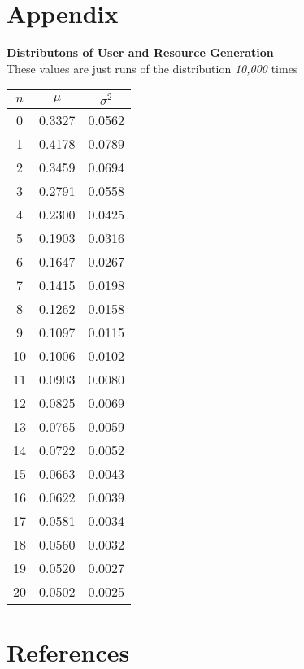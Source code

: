 \documentclass[12pt,a4paper]{report}
\begin{document}
\chapter{Appendix}

\begin{center}
\large
\textup{\textbf{Distributons of User and Resource Generation\\}}
\normalsize
\textup{These values are just runs of the distribution \emph{10,000} times}
\begin{tabular}{|c|c|c|}
\hline
\textbf{$n$} & \textbf{$\mu$} & \textbf{$\sigma^2$} \\
\hline
0 & 0.3327 & 0.0562\\
\hline
1 & 0.4178 & 0.0789 \\
\hline
2 & 0.3459 & 0.0694 \\
\hline
3 & 0.2791 & 0.0558 \\
\hline
4 & 0.2300 & 0.0425 \\
\hline
5 & 0.1903 & 0.0316 \\
\hline
6 & 0.1647 & 0.0267 \\
\hline
7 & 0.1415 & 0.0198 \\
\hline
8 & 0.1262 & 0.0158 \\
\hline
9 & 0.1097 & 0.0115 \\
\hline
10 & 0.1006 & 0.0102 \\
\hline
11 & 0.0903 & 0.0080 \\
\hline
12 & 0.0825 & 0.0069 \\
\hline
13 & 0.0765 & 0.0059 \\
\hline
14 & 0.0722 & 0.0052 \\
\hline
15 & 0.0663 & 0.0043 \\
\hline
16 & 0.0622 & 0.0039 \\
\hline
17 & 0.0581 & 0.0034 \\
\hline
18 & 0.0560 & 0.0032 \\
\hline
19 & 0.0520 & 0.0027 \\
\hline
20 & 0.0502 & 0.0025 \\
\hline
\end{tabular}
\end{center}

\clearpage

\chapter{References}
\end{document}
